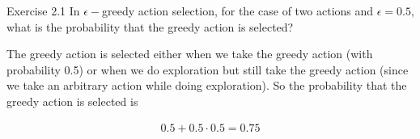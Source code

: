 \begin{exercise}
Exercise 2.1 In $\epsilon-$greedy action selection, for the case of two actions and $\epsilon = 0.5$, what is the probability that the greedy action is selected?
\end{exercise}

\begin{solution}
The greedy action is selected either when we take the greedy action (with probability 0.5) or when we do exploration but still take the greedy action (since we take an arbitrary action while doing exploration).
So the probability that the greedy action is selected is

\begin{align*}
  0.5 +0.5\cdot 0.5
  =
  0.75
\end{align*}
\end{solution}
